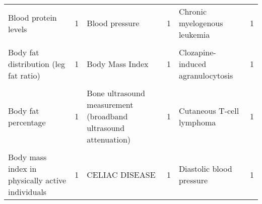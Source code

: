 \begin{table}[H]
{\begin{tabular}[t]{lrlrlr}
Blood protein levels & 1 & Blood pressure & 1 & Chronic myelogenous leukemia & 1\\
\cellcolor{gray!6}{Body fat distribution (arm fat ratio)} & \cellcolor{gray!6}{1} & \cellcolor{gray!6}{Blood urea nitrogen levels} & \cellcolor{gray!6}{1} & \cellcolor{gray!6}{Clear cell renal carcinoma} & \cellcolor{gray!6}{1}\\
Body fat distribution (leg fat ratio) & 1 & Body Mass Index & 1 & Clozapine-induced agranulocytosis & 1\\
\cellcolor{gray!6}{Body fat distribution (trunk fat ratio)} & \cellcolor{gray!6}{1} & \cellcolor{gray!6}{Bone properties (heel)} & \cellcolor{gray!6}{1} & \cellcolor{gray!6}{Coffee consumption} & \cellcolor{gray!6}{1}\\
Body fat percentage & 1 & Bone ultrasound measurement (broadband ultrasound attenuation) & 1 & Cutaneous T-cell lymphoma & 1\\
\cellcolor{gray!6}{Body mass index (joint analysis main effects and physical activity interaction)} & \cellcolor{gray!6}{1} & \cellcolor{gray!6}{Bone ultrasound measurement (velocity of sound)} & \cellcolor{gray!6}{1} & \cellcolor{gray!6}{Cutaneous melanoma} & \cellcolor{gray!6}{1}\\
Body mass index in physically active individuals & 1 & CELIAC DISEASE & 1 & Diastolic blood pressure & 1\\
\bottomrule
\end{tabular}}
\end{table}

